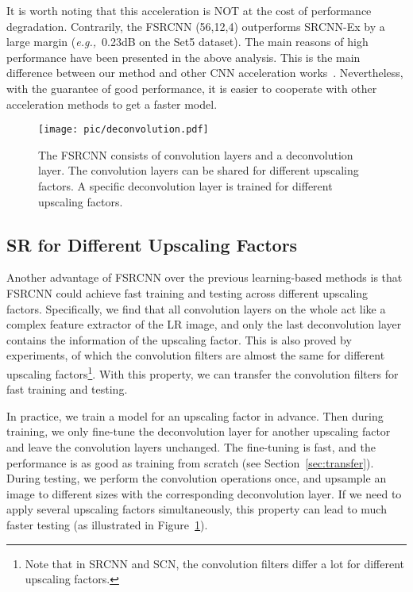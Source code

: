 \documentclass[runningheads]{llncs}
\newcommand{\eg}{\emph{e.g.,}}
\begin{document}
It is worth noting that this acceleration is NOT at the cost of performance degradation. Contrarily, the FSRCNN (56,12,4) outperforms SRCNN-Ex by a large margin (\eg~0.23dB on the Set5 dataset). The main reasons of high performance have been presented in the above analysis. This is the main difference between our method and other CNN acceleration works~\cite{Denton2014,Zhang2015}. Nevertheless, with the guarantee of good performance, it is easier to cooperate with other acceleration methods to get a faster model.

\begin{figure}[t]
\centering
  \texttt{[image: pic/deconvolution.pdf]}
\caption{The FSRCNN consists of convolution layers and a deconvolution layer. The convolution layers can be shared for different upscaling factors. A specific deconvolution layer is trained for different upscaling factors.}
  \label{fig:deconvolution}
\end{figure}

\subsection{SR for Different Upscaling Factors}
\label{subsec:across_factor}

Another advantage of FSRCNN over the previous learning-based methods is that FSRCNN could achieve fast training and testing across different upscaling factors.
Specifically, we find that all convolution layers on the whole act like a complex feature extractor of the LR image, and only the last deconvolution layer contains the information of the upscaling factor. This is also proved by experiments, of which the convolution filters are almost the same for different upscaling factors\footnote{Note that in SRCNN and SCN, the convolution filters differ a lot for different upscaling factors.}. With this property, we can transfer the convolution filters for fast training and testing.

In practice, we train a model for an upscaling factor in advance. Then during training, we only fine-tune the deconvolution layer for another upscaling factor and leave the convolution layers unchanged. The fine-tuning is fast, and the performance is as good as training from scratch (see Section~\ref{sec:transfer}). During testing, we perform the convolution operations once, and upsample an image to different sizes with the corresponding deconvolution layer. If we need to apply several upscaling factors simultaneously, this property can lead to much faster testing (as illustrated in Figure~\ref{fig:deconvolution}).
\end{document}
